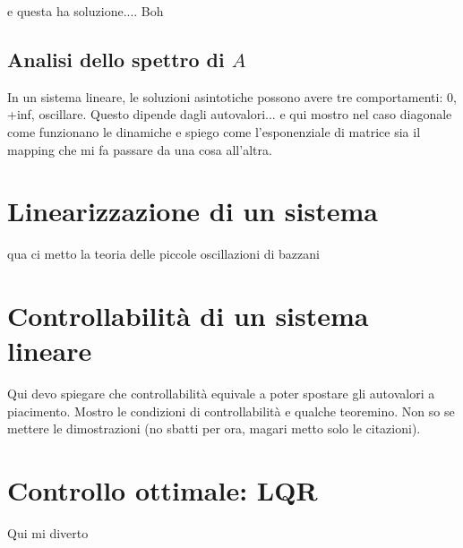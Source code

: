 e questa ha soluzione.... Boh


\subsection{Analisi dello spettro di $A$}
In un sistema lineare, le soluzioni asintotiche possono avere tre comportamenti:
0, +inf, oscillare. Questo dipende dagli autovalori...
e qui mostro nel caso diagonale come funzionano le dinamiche e spiego come l'esponenziale
di matrice sia il mapping che mi fa passare da una cosa all'altra.

\section{Linearizzazione di un sistema}
qua ci metto la teoria delle piccole oscillazioni di bazzani

\section{Controllabilità di un sistema lineare}
Qui devo spiegare che controllabilità equivale a poter spostare gli autovalori a piacimento.
Mostro le condizioni di controllabilità e qualche teoremino. Non so se mettere le
dimostrazioni (no sbatti per ora, magari metto solo le citazioni).

\section{Controllo ottimale: LQR} 
Qui mi diverto